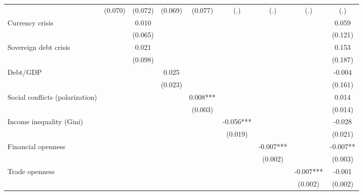 \begin{tabular}{l*{8}{c}}
                                &     (0.070)   &     (0.072)   &     (0.069)   &     (0.077)   &         (.)   &         (.)   &         (.)   &         (.)   \\
Currency crisis                 &               &       0.010   &               &               &               &               &               &       0.059   \\
                                &               &     (0.065)   &               &               &               &               &               &     (0.121)   \\
Sovereign debt crisis           &               &       0.021   &               &               &               &               &               &       0.153   \\
                                &               &     (0.098)   &               &               &               &               &               &     (0.187)   \\
Debt/GDP                        &               &               &       0.025   &               &               &               &               &      -0.004   \\
                                &               &               &     (0.023)   &               &               &               &               &     (0.161)   \\
Social conflicts (polarization) &               &               &               &       0.008***&               &               &               &       0.014   \\
                                &               &               &               &     (0.003)   &               &               &               &     (0.014)   \\
Income inequality (Gini)        &               &               &               &               &      -0.056***&               &               &      -0.028   \\
                                &               &               &               &               &     (0.019)   &               &               &     (0.021)   \\
Financial openness              &               &               &               &               &               &      -0.007***&               &      -0.007** \\
                                &               &               &               &               &               &     (0.002)   &               &     (0.003)   \\
Trade openness                  &               &               &               &               &               &               &      -0.007***&      -0.001   \\
                                &               &               &               &               &               &               &     (0.002)   &     (0.002)   \\



\end{tabular}
